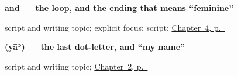 \noindent\begin{minipage}[t]{\linewidth}
\raggedright
\textbf{ and  — the loop, and the ending that means \textquotedblleft{}feminine\textquotedblright{}}\par
\footnotesize script and writing topic; explicit focus: script; \hyperref[ch:ar-farewells]{Chapter~4, p.~\pageref*{ch:ar-farewells}}
\end{minipage}\par\smallskip

\noindent\begin{minipage}[t]{\linewidth}
\raggedright
\textbf{ (yāʾ) — the last dot-letter, and \textquotedblleft{}my name\textquotedblright{}}\par
\footnotesize script and writing topic; \hyperref[ch:introductions]{Chapter~2, p.~\pageref*{ch:introductions}}
\end{minipage}\par\smallskip
